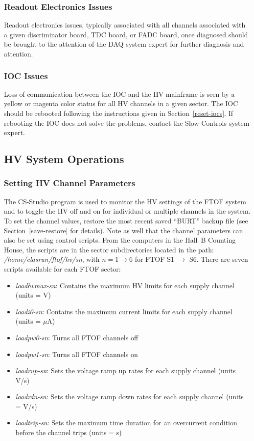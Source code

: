 \documentclass[12pt]{article}
\begin{document}
\subsubsection{Readout Electronics Issues}
\label{readout-issues}

Readout electronics issues, typically associated with all channels associated with a 
given discriminator board, TDC board, or FADC board, once diagnosed should be brought 
to the attention of the DAQ system expert for further diagnosis and attention.

\subsubsection{IOC Issues}
\label{ioc-issues}

Loss of communication between the IOC and the HV mainframe is seen by a yellow or 
magenta color status for all HV channels in a given sector. The IOC should be rebooted 
following the instructions given in Section~\ref{reset-iocs}. If rebooting the IOC does 
not solve the problems, contact the Slow Controls system expert.

\subsection{HV System Operations}

\subsubsection{Setting HV Channel Parameters}
\label{hv-parms}

The CS-Studio program is used to monitor the HV settings of the FTOF system and to 
toggle the HV off and on for individual or multiple channels in the system. To set the
channel values, restore the most recent saved ``BURT'' backup file (see
Section~\ref{save-restore} for details). Note as well that the channel parameters can
also be set using control scripts. From the computers in the Hall~B Counting House, the
scripts are in the sector subdirectories located in the path: {\it /home/clasrun/ftof/hv/sn}, 
with $n = 1 \to 6$ for FTOF S1 $\to$ S6. There are seven scripts available for 
each FTOF sector:

\begin{itemize}
\item {\it loadhvmax-sn}: Contains the maximum HV limits for each supply channel (units 
= V)
\item {\it loadi0-sn}: Contains the maximum current limits for each supply channel 
(units = $\mu$A)
\item {\it loadpw0-sn}: Turns all FTOF channels off
\item {\it loadpw1-sn}: Turns all FTOF channels on
\item {\it loadrup-sn}: Sets the voltage ramp up rates for each supply channel (units 
= V/s)
\item {\it loadrdn-sn}: Sets the voltage ramp down rates for each supply channel (units 
= V/s)
\item {\it loadtrip-sn}: Sets the maximum time duration for an overcurrent condition 
before the channel trips (units = s)
\end{itemize}
\end{document}
